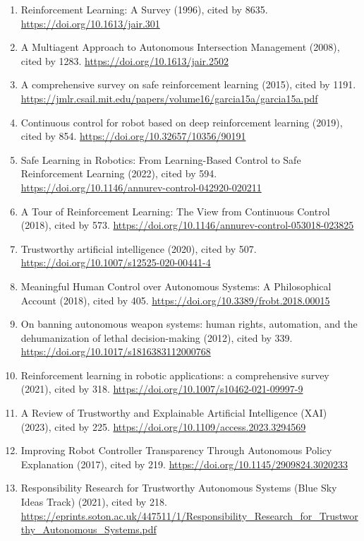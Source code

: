 \documentclass[
]{article}
\providecommand{\tightlist}{%
  \setlength{\itemsep}{0pt}\setlength{\parskip}{0pt}}
\begin{document}
\begin{enumerate}
\def\labelenumi{\arabic{enumi}.}
\tightlist
\item
  Reinforcement Learning: A Survey (1996), cited by 8635.
  \url{https://doi.org/10.1613/jair.301}
\item
  A Multiagent Approach to Autonomous Intersection Management (2008),
  cited by 1283. \url{https://doi.org/10.1613/jair.2502}
\item
  A comprehensive survey on safe reinforcement learning (2015), cited by
  1191.
  \url{https://jmlr.csail.mit.edu/papers/volume16/garcia15a/garcia15a.pdf}
\item
  Continuous control for robot based on deep reinforcement learning
  (2019), cited by 854. \url{https://doi.org/10.32657/10356/90191}
\item
  Safe Learning in Robotics: From Learning-Based Control to Safe
  Reinforcement Learning (2022), cited by 594.
  \url{https://doi.org/10.1146/annurev-control-042920-020211}
\item
  A Tour of Reinforcement Learning: The View from Continuous Control
  (2018), cited by 573.
  \url{https://doi.org/10.1146/annurev-control-053018-023825}
\item
  Trustworthy artificial intelligence (2020), cited by 507.
  \url{https://doi.org/10.1007/s12525-020-00441-4}
\item
  Meaningful Human Control over Autonomous Systems: A Philosophical
  Account (2018), cited by 405.
  \url{https://doi.org/10.3389/frobt.2018.00015}
\item
  On banning autonomous weapon systems: human rights, automation, and
  the dehumanization of lethal decision-making (2012), cited by 339.
  \url{https://doi.org/10.1017/s1816383112000768}
\item
  Reinforcement learning in robotic applications: a comprehensive survey
  (2021), cited by 318. \url{https://doi.org/10.1007/s10462-021-09997-9}
\item
  A Review of Trustworthy and Explainable Artificial Intelligence (XAI)
  (2023), cited by 225.
  \url{https://doi.org/10.1109/access.2023.3294569}
\item
  Improving Robot Controller Transparency Through Autonomous Policy
  Explanation (2017), cited by 219.
  \url{https://doi.org/10.1145/2909824.3020233}
\item
  Responsibility Research for Trustworthy Autonomous Systems (Blue Sky
  Ideas Track) (2021), cited by 218.
  \url{https://eprints.soton.ac.uk/447511/1/Responsibility_Research_for_Trustworthy_Autonomous_Systems.pdf}

\end{enumerate}
\end{document}
